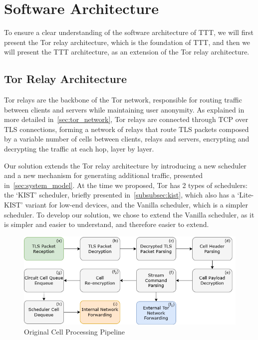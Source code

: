 \section{Software Architecture}\label{sec:software_architecture}

To ensure a clear understanding of the software architecture of TTT, we will first present the Tor relay architecture, which is the foundation of TTT, and then we will present the TTT architecture, as an extension of the Tor relay architecture.

\subsection{Tor Relay Architecture}\label{sec:tor_relay_architecture}
Tor relays are the backbone of the Tor network, responsible for routing traffic between clients and servers while maintaining user anonymity.  As explained in more detailed in~\autoref{sec:tor_network}, Tor relays are connected through TCP over TLS connections, forming a network of relays that route TLS packets composed by a variable number of cells between clients, relays and servers, encrypting and decrypting the traffic at each hop, layer by layer.

Our solution extends the Tor relay architecture by introducing a new scheduler and a new mechanism for generating additional traffic, presented in~\autoref{sec:system_model}. 
At the time we proposed, Tor has 2 types of schedulers: the `KIST' scheduler, briefly presented in~\autoref{subsubsec:kist}, which also has a `Lite-KIST' variant for low-end devices, and the Vanilla scheduler, which is a simpler scheduler. To develop our solution, we chose to extend the Vanilla scheduler, as it is simpler and easier to understand, and therefore easier to extend.

\begin{figure}[!h]
  \centering
  \includegraphics[width=\textwidth]{Chapters/Figures/Tor_Cell_Pipeline.png}
  \caption{Original Cell Processing Pipeline}\label{fig:tor_cell_lifetime}
\end{figure}

